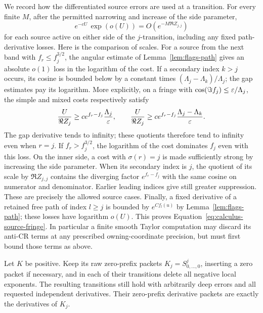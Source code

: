 We record how the differentiated source errors are used at a transition.
For every finite $M$, after the permitted narrowing and increase of the
side parameter,
\begin{equation}
 e^{-cU}\,\exp(o(U))
       =O(e^{-M\Re Z_{j,j}})
 \label{eq:calculus-source-fringe}
\end{equation}
for each source active on either side of the $j$-transition, including any
fixed path-derivative losses.  Here is the comparison of scales.  For a
source from the next band with $f_r\le f_j^{3/2}$, the angular estimate of
Lemma~\ref{lem:flags-path} gives an absolute $o(1)$ loss in the logarithm
of the cost.  If a secondary index $k>j$ occurs, its cosine is bounded
below by a constant times $(\Lambda_j-\Lambda_k)/\Lambda_j$; the gap
estimates pay its logarithm.  More explicitly, on a fringe with
$\cos(\Im f_j)\le\varepsilon/\Lambda_j$, the simple and mixed costs respectively
satisfy
\[
 \frac{U}{\Re Z_j}\ge
 c e^{f_r-f_j}\frac{\Lambda_j}{\varepsilon},\qquad
 \frac{U}{\Re Z_j}\ge
 c e^{f_r-f_j}\frac{\Lambda_j-\Lambda_k}{\varepsilon}.
\]
The gap derivative tends to infinity; these quotients therefore tend to
infinity even when $r=j$.  If $f_r>f_j^{3/2}$, the logarithm of the cost
dominates $f_j$ even with this loss.  On the inner side, a cost with
$\sigma(r)=j$ is made sufficiently strong by increasing the side
parameter.  When its secondary index is $j$, the quotient of its scale by
$\Re Z_{j,j}$ contains the diverging factor $e^{f_r-f_j}$ with the same
cosine on numerator and denominator.  Earlier leading indices give still
greater suppression.  These are precisely the allowed source cases.
Finally, a fixed derivative of a retained free path of index $l\ge j$
is bounded by $e^{C f_l(u)}$ by Lemma~\ref{lem:flags-path}; these losses
have logarithm $o(U)$.  This proves
Equation~\eqref{eq:calculus-source-fringe}.  In particular a finite smooth
Taylor computation may discard its anti-CR terms at any prescribed
owning-coordinate precision, but must first bound those terms as above.

\begin{lemma}
\label{lem:calculus-cleanup}
Let $K$ be positive.  Keep its raw zero-prefix packets
$K_j=S^j_{0,\ldots,0}$, inserting a zero packet if necessary, and in each
of their transitions delete all negative local exponents.  The resulting
transitions still hold with arbitrarily deep errors and all requested
independent derivatives.  Their zero-prefix derivative packets are exactly
the derivatives of $K_j$.
\end{lemma}

